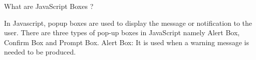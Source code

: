 What are JavaScript Boxes ?

In Javascript, popup boxes are used to display the message or notification to the user. 
There are three types of pop-up boxes in JavaScript namely Alert Box,
Confirm Box and Prompt Box. Alert Box: It is used when a warning message is needed to be produced.